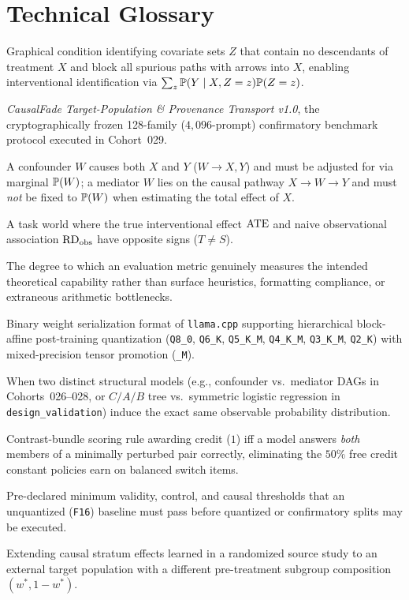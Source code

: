 \chapter{Technical Glossary}\label{app:glossary}
\begin{description}[style=nextline,leftmargin=1.5em]
  \item[Backdoor Criterion] Graphical condition identifying covariate sets $Z$ that contain no descendants of treatment $X$ and block all spurious paths with arrows into $X$, enabling interventional identification via $\sum_z \mathbb{P}(Y\mid X,Z=z)\mathbb{P}(Z=z)$.
  \item[CF-TP1] \emph{CausalFade Target-Population \& Provenance Transport v1.0}, the cryptographically frozen 128-family ($4{,}096$-prompt) confirmatory benchmark protocol executed in Cohort~029.
  \item[Confounder vs.\ Mediator] A confounder $W$ causes both $X$ and $Y$ ($W\to X, Y$) and must be adjusted for via marginal $\mathbb{P}(W)$; a mediator $W$ lies on the causal pathway $X\to W\to Y$ and must \emph{not} be fixed to $\mathbb{P}(W)$ when estimating the total effect of $X$.
  \item[Conflict Item (Simpson's Reversal)] A task world where the true interventional effect $\mathrm{ATE}$ and naive observational association $\mathrm{RD}_{\mathrm{obs}}$ have opposite signs ($T \neq S$).
  \item[Construct Validity] The degree to which an evaluation metric genuinely measures the intended theoretical capability rather than surface heuristics, formatting compliance, or extraneous arithmetic bottlenecks.
  \item[GGUF \& K-Quants] Binary weight serialization format of \texttt{llama.cpp} supporting hierarchical block-affine post-training quantization (\texttt{Q8\_0}, \texttt{Q6\_K}, \texttt{Q5\_K\_M}, \texttt{Q4\_K\_M}, \texttt{Q3\_K\_M}, \texttt{Q2\_K}) with mixed-precision tensor promotion (\texttt{\_M}).
  \item[Observational Equivalence] When two distinct structural models (e.g., confounder vs.\ mediator DAGs in Cohorts~026--028, or $C/A/B$ tree vs.\ symmetric logistic regression in \texttt{design\_validation}) induce the exact same observable probability distribution.
  \item[Pairwise Fidelity ($F_{\mathrm{pair}}$)] Contrast-bundle scoring rule awarding credit ($1$) iff a model answers \emph{both} members of a minimally perturbed pair correctly, eliminating the $50\%$ free credit constant policies earn on balanced switch items.
  \item[Reference Competence Gate] Pre-declared minimum validity, control, and causal thresholds that an unquantized (\texttt{F16}) baseline must pass before quantized or confirmatory splits may be executed.
  \item[Transportability] Extending causal stratum effects learned in a randomized source study to an external target population with a different pre-treatment subgroup composition $(w^*, 1-w^*)$.
\end{description}


